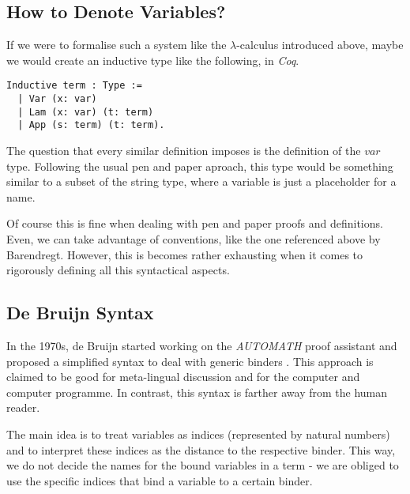 \subsection{How to Denote Variables?}

If we were to formalise such a system like the $\lambda$-calculus introduced above, maybe we would create an inductive type like the following, in \textit{Coq}.

\begin{lstlisting}[language=Coq]
  Inductive term : Type :=
  | Var (x: var)
  | Lam (x: var) (t: term)
  | App (s: term) (t: term).
\end{lstlisting}

The question that every similar definition imposes is the definition of the $var$ type. Following the usual pen and paper aproach, this type would be something similar to a subset of the string type, where a variable is just a placeholder for a name.

Of course this is fine when dealing with pen and paper proofs and definitions. Even, we can take advantage of conventions, like the one referenced above by Barendregt. However, this is becomes rather exhausting  when it comes to rigorously defining all this syntactical aspects.


\subsection{De Bruijn Syntax}


In the 1970s, de Bruijn started working on the \textit{AUTOMATH} proof assistant and proposed a simplified syntax to deal with generic binders \cite{deBruijn}.
This approach is claimed to be good for meta-lingual discussion and for the computer and computer programme. In contrast, this syntax is farther away from the human reader.

The main idea is to treat variables as indices (represented by natural numbers) and to interpret these indices as the distance to the respective binder.
This way, we do not decide the names for the bound variables in a term - we are obliged to use the specific indices that bind a variable to a certain binder.

